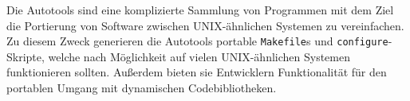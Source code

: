 Die Autotools  sind eine komplizierte
Sammlung von Programmen mit dem Ziel die Portierung von Software zwischen
UNIX-ähnlichen Systemen zu vereinfachen.
%
Zu diesem Zweck generieren die Autotools portable \texttt{Makefile}s und
\texttt{configure}-Skripte, welche nach Möglichkeit auf vielen UNIX-ähnlichen
Systemen funktionieren sollten. Außerdem bieten sie Entwicklern Funktionalität
für den portablen Umgang mit dynamischen Codebibliotheken.

